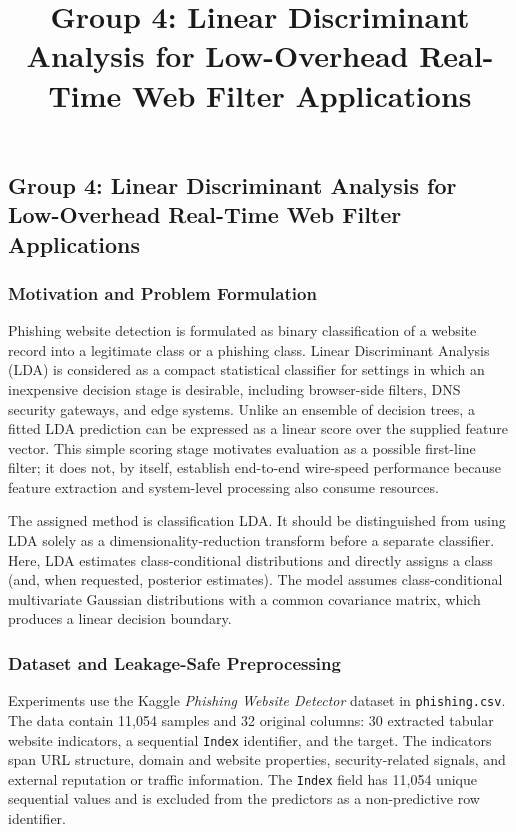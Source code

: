 \documentclass[conference]{IEEEtran}
\title{Group 4: Linear Discriminant Analysis for Low-Overhead Real-Time Web Filter Applications}
\author{\IEEEauthorblockN{Group 4}\IEEEauthorblockA{Bharatiya Vidya Bhavan's Sardar Patel Institute of Technology, Mumbai}}
\begin{document}
\maketitle

\subsection{Group 4: Linear Discriminant Analysis for Low-Overhead Real-Time Web Filter Applications}
\label{subsec:group4-lda}

\subsubsection{Motivation and Problem Formulation}
Phishing website detection is formulated as binary classification of a website record into a legitimate class or a phishing class. Linear Discriminant Analysis (LDA) is considered as a compact statistical classifier for settings in which an inexpensive decision stage is desirable, including browser-side filters, DNS security gateways, and edge systems. Unlike an ensemble of decision trees, a fitted LDA prediction can be expressed as a linear score over the supplied feature vector. This simple scoring stage motivates evaluation as a possible first-line filter; it does not, by itself, establish end-to-end wire-speed performance because feature extraction and system-level processing also consume resources.

The assigned method is classification LDA. It should be distinguished from using LDA solely as a dimensionality-reduction transform before a separate classifier. Here, LDA estimates class-conditional distributions and directly assigns a class (and, when requested, posterior estimates). The model assumes class-conditional multivariate Gaussian distributions with a common covariance matrix, which produces a linear decision boundary.

\subsubsection{Dataset and Leakage-Safe Preprocessing}
Experiments use the Kaggle \emph{Phishing Website Detector} dataset in \texttt{phishing.csv}. The data contain 11,054 samples and 32 original columns: 30 extracted tabular website indicators, a sequential \texttt{Index} identifier, and the target. The indicators span URL structure, domain and website properties, security-related signals, and external reputation or traffic information. The \texttt{Index} field has 11,054 unique sequential values and is excluded from the predictors as a non-predictive row identifier.
\end{document}
